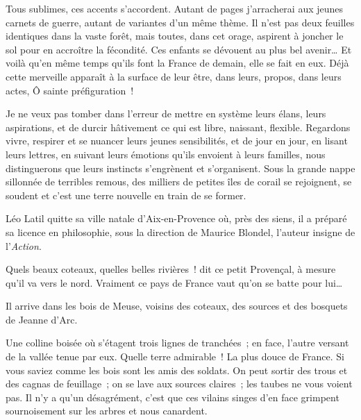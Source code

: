 \documentclass[french,twoside]{book} %
\newenvironment{quoteblock}%
  {\begin{quoting}}
  {\end{quoting}}
\newenvironment{quotebar}{%
    \def\FrameCommand{{\color{rubric!10!}\vrule width 0.5em} \hspace{0.9em}}%
    \def\OuterFrameSep{\itemsep} %
    \MakeFramed {\advance\hsize-\width \FrameRestore}
  }%
  {%
    \endMakeFramed
  }
\renewenvironment{quoteblock}%
  {%
    \savenotes
    \setstretch{0.9}
    \normalfont
    \begin{quotebar}
  }
  {%
    \end{quotebar}
    \spewnotes
  }
\begin{document}
\noindent Tous sublimes, ces accents s’accordent. Autant de pages j’arracherai aux jeunes carnets de guerre, autant de variantes d’un même thème. Il n’est pas deux feuilles identiques dans la vaste forêt, mais toutes, dans cet orage, aspirent à joncher le sol pour en accroître la fécondité. Ces enfants se dévouent au plus bel avenir… Et voilà qu’en même temps qu’ils font la France de demain, elle se fait en eux. Déjà cette merveille apparaît à la surface de leur être, dans leurs, propos, dans leurs actes, Ô sainte préfiguration !‌\par
Je ne veux pas tomber dans l’erreur de mettre en système leurs élans, leurs aspirations, et de durcir hâtivement ce qui est libre, naissant, flexible. Regardons vivre, respirer et se nuancer leurs jeunes sensibilités, et de jour en jour, en lisant leurs lettres, en suivant leurs émotions qu’ils envoient à leurs familles, nous distinguerons que leurs instincts s’engrènent et s’organisent. Sous la grande nappe sillonnée de terribles remous, des milliers de petites îles de corail se rejoignent, se soudent et c’est une terre nouvelle en train de se former.‌\par
Léo Latil quitte sa ville natale d’Aix-en-Provence où, près des siens, il a préparé sa licence en philosophie, sous la direction de Maurice Blondel, l’auteur insigne de l’{\itshape Action}.‌\par

\begin{quoteblock}
 \noindent Quels beaux coteaux, quelles belles rivières ! dit ce petit Provençal, à mesure qu’il va vers le nord. Vraiment ce pays de France vaut qu’on se batte pour lui…‌
 \end{quoteblock}

\noindent Il arrive dans les bois de Meuse, voisins des coteaux, des sources et des bosquets de Jeanne d’Arc.\par

\begin{quoteblock}
 \noindent Une colline boisée où s’étagent trois lignes de tranchées ; en face, l’autre versant de la vallée tenue par eux. Quelle terre admirable ! La plus douce de France. Si vous saviez comme les bois sont les amis des soldats. On peut sortir des trous et des cagnas de feuillage ; on se lave aux sources claires ; les taubes ne vous voient pas. Il n’y a qu’un désagrément, c’est que ces vilains singes d’en face grimpent sournoisement sur les arbres et nous canardent.‌
 \end{quoteblock}
\end{document}
